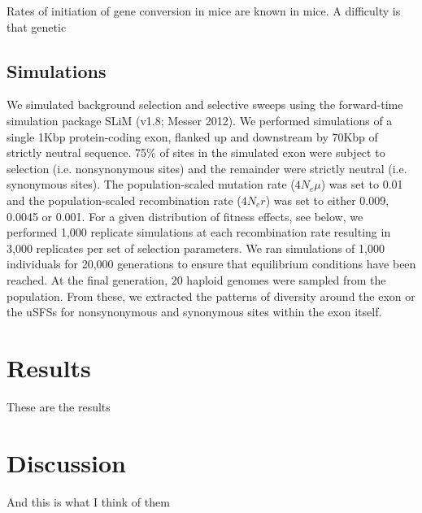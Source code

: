 \documentclass{article}
\begin{document}
	Rates of initiation of gene conversion in mice are known in mice.
A difficulty is that genetic 
 
	\subsection*{Simulations}
	We simulated background selection and selective sweeps using the forward-time simulation package SLiM (v1.8; Messer 2012). We performed simulations of a single 1Kbp protein-coding exon, flanked up and downstream by 70Kbp of strictly neutral sequence. 75\% of sites in the simulated exon were subject to selection (i.e. nonsynonymous sites) and the remainder were strictly neutral (i.e. synonymous sites). The population-scaled mutation rate (\emph{$4N_{e}\mu$}) was set to 0.01 and the population-scaled recombination rate (\emph{$4N_{e}r$}) was set to either 0.009, 0.0045 or 0.001. For a given distribution of fitness effects, see below, we performed 1,000 replicate simulations at each recombination rate resulting in 3,000 replicates per set of selection parameters. We ran simulations of 1,000 individuals for 20,000 generations to ensure that equilibrium conditions have been reached. At the final generation, 20 haploid genomes were sampled from the population. From these, we extracted the patterns of diversity around the exon or the uSFSs for nonsynonymous and synonymous sites within the exon itself.


\section*{Results}
These are the results

\section*{Discussion}
And this is what I think of them
\end{document}
